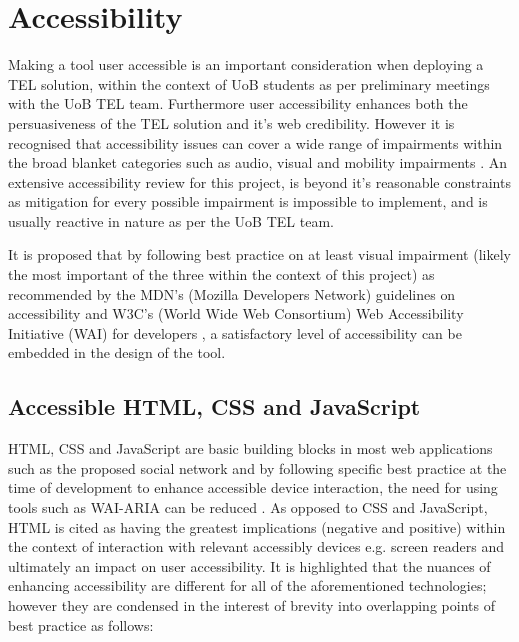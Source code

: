 



\section{Accessibility}

Making a tool user accessible is an important consideration when deploying a TEL solution, within the context of UoB students as per preliminary meetings with the UoB TEL team. Furthermore user accessibility enhances both the persuasiveness of the TEL solution and it's web credibility. However it is recognised that accessibility issues can cover a wide range of impairments within the broad blanket categories such as audio, visual and mobility impairments \cite{Mills2015}. An extensive accessibility review for this project, is beyond it's reasonable constraints as mitigation for every possible impairment is impossible to implement, and is usually reactive in nature as per the UoB TEL team.

It is proposed that by following best practice on at least visual impairment (likely the most important of the three within the context of this project) as recommended by the MDN's (Mozilla Developers Network) guidelines \cite{Mills2015,Mills2016} on accessibility and W3C's (World Wide Web Consortium) Web Accessibility Initiative (WAI) for developers \cite{W3C}, a satisfactory level of accessibility can be embedded in the design of the tool.

\subsection{Accessible HTML, CSS and JavaScript}

HTML, CSS and JavaScript are basic building blocks in most web applications such as the proposed social network and by following specific best practice at the time of development to enhance accessible device interaction, the need for using tools such as WAI-ARIA can be reduced \cite{W3C,OWASP,Mills2015,Mills2016}. As opposed to CSS and JavaScript, HTML is cited as having the greatest implications (negative and positive)  within the context of interaction with relevant accessibly devices e.g. screen readers \cite{Mills,Mills2017} and ultimately an impact on user accessibility.  It is highlighted that the nuances of enhancing accessibility are different for all of the aforementioned technologies; however they are condensed in the interest of brevity into overlapping points of best practice as follows:


